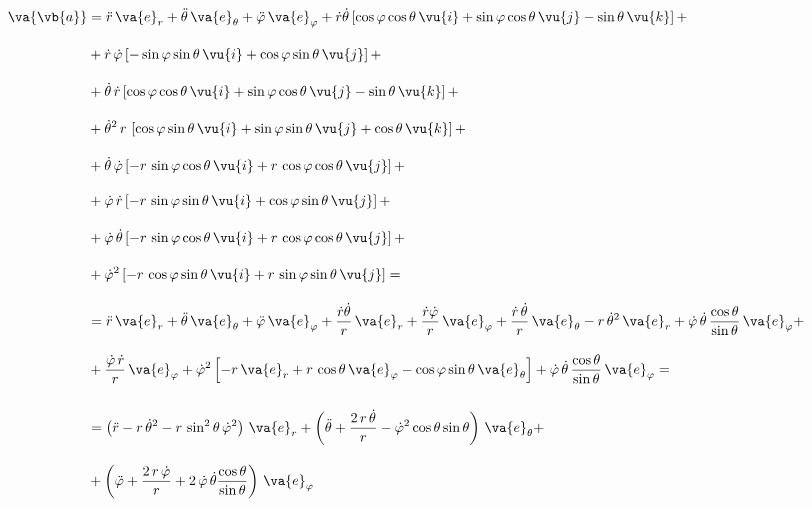 \begin{align*}
\va{\vb{a}} &= \ddot{r} \, \va{e}_{r} + \ddot{\theta} \, \va{e}_{\theta} + \ddot{\varphi} \, \va{e}_{\varphi} + \dot{r} \dot{\theta} \left[ \cos \varphi \cos \theta \, \vu{i} + \sin \varphi \cos \theta \, \vu{j} - \sin \theta \, \vu{k} \right] + \\[1em]
&+ \dot{r} \, \dot{\varphi} \left[ - \sin \varphi \sin \theta \, \vu{i} + \cos \varphi \sin \theta \, \vu{j} \right] + \\[1em]
&+ \dot{\theta} \, \dot{r} \left[ \cos \varphi \cos \theta \, \vu{i} + \sin \varphi \cos \theta \, \vu{j} - \sin \theta \, \vu{k} \right] + \\[1em]
&+ \dot{\theta}^{2} \, r \, \left[ \cos \varphi \sin \theta \, \vu{i} + \sin \varphi \sin \theta \, \vu{j} + \cos \theta \, \vu{k} \right] + \\[1em]
&+ \dot{\theta} \, \dot{\varphi} \left[ -r \, \sin \varphi \cos \theta \, \vu{i} + r \, \cos \varphi \cos \theta \, \vu{j} \right] + \\[1em]
&+ \dot{\varphi} \, \dot{r} \left[ -r \, \sin \varphi \sin \theta \, \vu{i} + \cos \varphi \sin \theta \, \vu{j} \right] + \\[1em]
&+ \dot{\varphi} \, \dot{\theta} \left[ -r \, \sin \varphi \cos \theta \, \vu{i} + r \, \cos \varphi \cos \theta \, \vu{j} \right] + \\[1em]
&+ \dot{\varphi}^{2} \left[ - r \, \cos \varphi \sin \theta \, \vu{i} + r \, \sin \varphi \sin  \theta \, \vu{j} \right] = \\[1em]
&= \ddot{r} \, \va{e}_{r} + \ddot{\theta} \, \va{e}_{\theta} + \ddot{\varphi} \, \va{e}_{\varphi} + \dfrac{\dot{r} \dot{\theta}}{r} \, \va{e}_{r} + \dfrac{\dot{r} \dot{\varphi}}{r} \, \va{e}_{\varphi} + \dfrac{\dot{r} \, \dot{\theta}}{r} \, \va{e}_{\theta} - r \, \dot{\theta}^{2} \, \va{e}_{r} + \dot{\varphi} \, \dot{\theta} \, \dfrac{\cos \theta}{\sin \theta} \, \va{e}_{\varphi} + \\[1em]
&+ \dfrac{\dot{\varphi} \, \dot{r}}{r} \, \va{e}_{\varphi} + \dot{\varphi}^{2} \left[ - r \, \va{e}_{r} + r \, \cos \theta \, \va{e}_{\varphi} - \cos \varphi \sin \theta  \, \va{e}_{\theta}\right] + \dot{\varphi} \, \dot{\theta} \, \dfrac{\cos \theta}{\sin \theta} \, \va{e}_{\varphi} = \\[1.5em]
&= \left( \ddot{r} - r \, \dot{\theta}^{2} - r \, \sin^{2} \theta \, \dot{\varphi}^{2} \right) \, \va{e}_{r} +  \left( \ddot{\theta} + \dfrac{2 \, r \, \dot{\theta}}{r} - \dot{\varphi}^{2} \cos \theta \sin \theta \right) \, \va{e}_{\theta} + \\[1em]
&+ \left( \ddot{\varphi} + \dfrac{2 \, r \, \dot{\varphi}}{r} + 2 \, \dot{\varphi} \, \dot{\theta} \dfrac{\cos \theta}{\sin \theta} \right) \, \va{e}_{\varphi} 
\end{align*}
